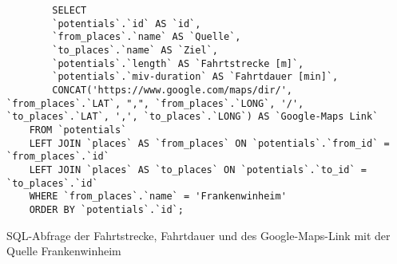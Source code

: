\begin{listing}[htbp]
    \begin{verbatim}
        SELECT 
        `potentials`.`id` AS `id`, 
        `from_places`.`name` AS `Quelle`,
        `to_places`.`name` AS `Ziel`, 
        `potentials`.`length` AS `Fahrtstrecke [m]`, 
        `potentials`.`miv-duration` AS `Fahrtdauer [min]`,
        CONCAT('https://www.google.com/maps/dir/', `from_places`.`LAT`, ",", `from_places`.`LONG`, '/', `to_places`.`LAT`, ',', `to_places`.`LONG`) AS `Google-Maps Link`
    FROM `potentials`
    LEFT JOIN `places` AS `from_places` ON `potentials`.`from_id` = `from_places`.`id`
    LEFT JOIN `places` AS `to_places` ON `potentials`.`to_id` = `to_places`.`id`
    WHERE `from_places`.`name` = 'Frankenwinheim'
    ORDER BY `potentials`.`id`;
    \end{verbatim}
    \caption{SQL-Abfrage der Fahrtstrecke, Fahrtdauer und des Google-Maps-Link mit der Quelle Frankenwinheim}\label{lst-f-frankenwinheim}
\end{listing}